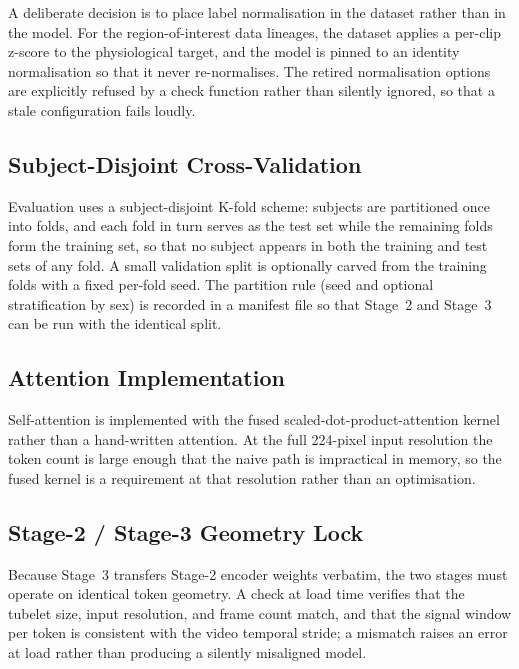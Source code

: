 A deliberate decision is to place label normalisation in the dataset rather than in the
model. For the region-of-interest data lineages, the dataset applies a per-clip z-score to
the physiological target, and the model is pinned to an identity normalisation so that it
never re-normalises. The retired normalisation options are explicitly refused by a check
function rather than silently ignored, so that a stale configuration fails loudly.

\subsection{Subject-Disjoint Cross-Validation}
\label{sec:impl-design-cv}

Evaluation uses a subject-disjoint K-fold scheme: subjects are partitioned once into
folds, and each fold in turn serves as the test set while the remaining folds form the
training set, so that no subject appears in both the training and test sets of any fold.
A small validation split is optionally carved from the training folds with a fixed
per-fold seed. The partition rule (seed and optional stratification by sex) is recorded in
a manifest file so that Stage~2 and Stage~3 can be run with the identical split.

\subsection{Attention Implementation}
\label{sec:impl-design-attention}

Self-attention is implemented with the fused scaled-dot-product-attention kernel rather
than a hand-written attention. At the full 224-pixel input resolution the token count is
large enough that the naive path is impractical in memory, so the fused kernel is a
requirement at that resolution rather than an optimisation.

\subsection{Stage-2 / Stage-3 Geometry Lock}
\label{sec:impl-design-geometry}

Because Stage~3 transfers Stage-2 encoder weights verbatim, the two stages must operate on
identical token geometry. A check at load time verifies that the tubelet size, input
resolution, and frame count match, and that the signal window per token is consistent with
the video temporal stride; a mismatch raises an error at load rather than producing a
silently misaligned model.

